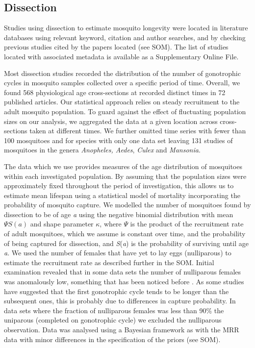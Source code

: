 \documentclass[]{article}
\begin{document}
\subsection{Dissection}\label{dissection}

Studies using dissection to estimate mosquito longevity were located in
literature databases using relevant keyword, citation and author
searches, and by checking previous studies cited by the papers located
(see SOM). The list of studies located with associated metadata is
available as a Supplementary Online File.

Most dissection studies recorded the distribution of the number of
gonotrophic cycles in mosquito samples collected over a specific period
of time. Overall, we found 568 physiological age cross-sections at recorded distinct times in 72 published articles. Our statistical approach relies on steady recruitment to the adult mosquito population. To guard against the effect of fluctuating population sizes on our analysis, we aggregated the data at a given location across cross-sections taken at different times. We further omitted time series with fewer than 100 mosquitoes and for
species with only one data set leaving 131 studies of mosquitoes in the
genera \emph{Anopheles, Aedes}, \emph{Culex} and \emph{Mansonia}.

The data which we use provides measures of the age distribution of mosquitoes within each investigated population. By assuming that the population sizes were approximately fixed throughout the period of investigation, this allows us to estimate mean lifespan using a statistical model of mortality incorporating the probability of mosquito capture. We modelled the number of mosquitoes found by dissection to be of age
\emph{a} using the negative binomial distribution with mean
$\Psi S(a)$ and shape parameter $\kappa$, where
$\Psi$ is the product of the recruitment rate of adult mosquitoes,
which we assume is constant over time, and the probability of being
captured for dissection, and \emph{S}(\emph{a}) is the probability of
surviving until age \emph{a}. We used the number of females that have
yet to lay eggs (nulliparous) to estimate the recruitment rate as
described further in the SOM. Initial examination revealed that in some
data sets the number of nulliparous females was anomalously low,
something that has been noticed before \citep{gillies1965study}. As some
studies have suggested that the first gonotrophic cycle tends to be
longer than the subsequent ones, this is probably due to differences in
capture probability. In data sets where the fraction of nulliparous
females was less than 90\% the uniparous (completed on gonotrophic
cycle) we excluded the nulliparous observation. Data was analysed using a Bayesian framework as with the MRR data with
minor differences in the specification of the priors (see SOM). 
\end{document}
